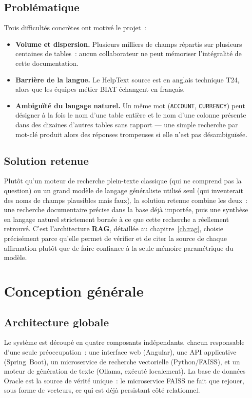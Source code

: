﻿\documentclass[12pt,a4paper]{report}
\newcommand{\code}[1]{\texttt{\color{biatbluedk}#1}}
\begin{document}
\section{Problématique}
Trois difficultés concrètes ont motivé le projet~:
\begin{itemize}
  \item \textbf{Volume et dispersion.} Plusieurs milliers de champs répartis sur plusieurs centaines de tables~: aucun collaborateur ne peut mémoriser l'intégralité de cette documentation.
  \item \textbf{Barrière de la langue.} Le HelpText source est en anglais technique T24, alors que les équipes métier BIAT échangent en français.
  \item \textbf{Ambiguïté du langage naturel.} Un même mot (\code{ACCOUNT}, \code{CURRENCY}) peut désigner à la fois le nom d'une table entière et le nom d'une colonne présente dans des dizaines d'autres tables sans rapport --- une simple recherche par mot-clé produit alors des réponses trompeuses si elle n'est pas désambiguïsée.
\end{itemize}

\section{Solution retenue}
Plutôt qu'un moteur de recherche plein-texte classique (qui ne comprend pas la question) ou un grand modèle de langage généraliste utilisé seul (qui inventerait des noms de champs plausibles mais faux), la solution retenue combine les deux~: une recherche documentaire précise dans la base déjà importée, puis une synthèse en langage naturel strictement bornée à ce que cette recherche a réellement retrouvé. C'est l'architecture \textbf{RAG}, détaillée au chapitre~\ref{ch:rag}, choisie précisément parce qu'elle permet de vérifier et de citer la source de chaque affirmation plutôt que de faire confiance à la seule mémoire paramétrique du modèle.

\chapter{Conception générale}
\label{ch:conception}

\section{Architecture globale}
Le système est découpé en quatre composants indépendants, chacun responsable d'une seule préoccupation~: une interface web (Angular), une API applicative (Spring~Boot), un microservice de recherche vectorielle (Python/FAISS), et un moteur de génération de texte (Ollama, exécuté localement). La base de données Oracle est la source de vérité unique~: le microservice FAISS ne fait que rejouer, sous forme de vecteurs, ce qui est déjà persistant côté relationnel.
\end{document}

